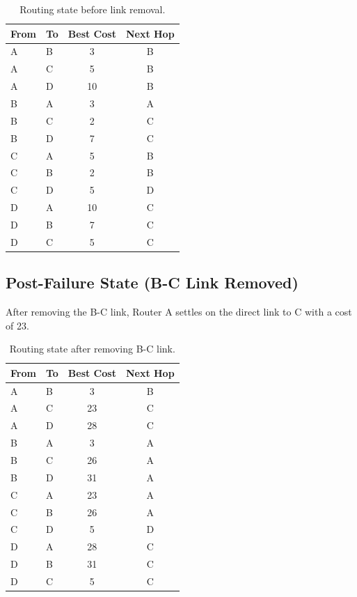 \documentclass[twocolumn,a4paper,10pt]{article}
\begin{document}
\begin{table}[H]
\centering
\scriptsize
\begin{tabular}{@{}llcc@{}}
\toprule
\textbf{From} & \textbf{To} & \textbf{Best Cost} & \textbf{Next Hop} \\ \midrule
A & B & 3 & B \\
A & C & 5 & B \\
A & D & 10 & B \\
B & A & 3 & A \\
B & C & 2 & C \\
B & D & 7 & C \\
C & A & 5 & B \\
C & B & 2 & B \\
C & D & 5 & D \\
D & A & 10 & C \\
D & B & 7 & C \\
D & C & 5 & C \\ \bottomrule
\end{tabular}
\caption{Routing state before link removal.}
\end{table}

\subsection{Post-Failure State (B-C Link Removed)}
After removing the B-C link, Router A settles on the direct link to C with a cost of 23.

\begin{table}[H]
\centering
\scriptsize
\begin{tabular}{@{}llcc@{}}
\toprule
\textbf{From} & \textbf{To} & \textbf{Best Cost} & \textbf{Next Hop} \\ \midrule
A & B & 3 & B \\
A & C & 23 & C \\
A & D & 28 & C \\
B & A & 3 & A \\
B & C & 26 & A \\
B & D & 31 & A \\
C & A & 23 & A \\
C & B & 26 & A \\
C & D & 5 & D \\
D & A & 28 & C \\
D & B & 31 & C \\
D & C & 5 & C \\ \bottomrule
\end{tabular}
\caption{Routing state after removing B-C link.}
\end{table}
\end{document}
